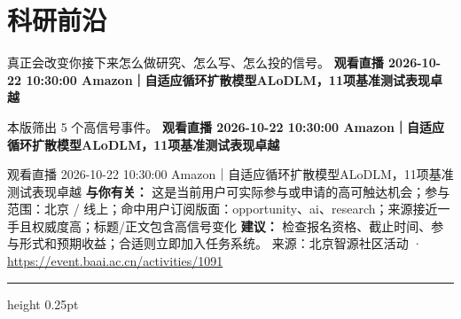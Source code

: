 \documentclass[10.5pt]{ctexart}
\begin{document}
\section*{科研前沿}
{\color{ormuted} 真正会改变你接下来怎么做研究、怎么写、怎么投的信号。}
\vspace{2mm}
{\LARGE\bfseries 观看直播 2026-10-22 10:30:00 Amazon｜自适应循环扩散模型ALoDLM，11项基准测试表现卓越}\par
\vspace{1mm}
{\color{ormuted} 本版筛出 5 个高信号事件。}
\vspace{3mm}
{\Large\bfseries 观看直播 2026-10-22 10:30:00 Amazon｜自适应循环扩散模型ALoDLM，11项基准测试表现卓越}\par
观看直播 2026-10-22 10:30:00 Amazon｜自适应循环扩散模型ALoDLM，11项基准测试表现卓越
\textbf{与你有关：} 这是当前用户可实际参与或申请的高可触达机会；参与范围：北京 / 线上；命中用户订阅版面：opportunity、ai、research；来源接近一手且权威度高；标题/正文包含高信号变化
\textbf{建议：} 检查报名资格、截止时间、参与形式和预期收益；合适则立即加入任务系统。
{\footnotesize\color{ormuted} 来源：北京智源社区活动 · \url{https://event.baai.ac.cn/activities/1091}}
\vspace{4mm}
\hrule height 0.25pt
\vspace{3mm}
\end{document}
